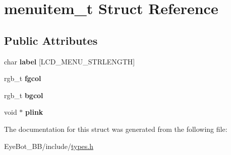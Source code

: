 \hypertarget{structmenuitem__t}{\section{menuitem\-\_\-t \-Struct \-Reference}
\label{structmenuitem__t}
}
\subsection*{\-Public \-Attributes}
\begin{DoxyCompactItemize}
\item 
\hypertarget{structmenuitem__t_a32e81d5a62c042327b8b9adc7f14bd5f}{char {\bfseries label} \mbox{[}\-L\-C\-D\-\_\-\-M\-E\-N\-U\-\_\-\-S\-T\-R\-L\-E\-N\-G\-T\-H\mbox{]}}\label{structmenuitem__t_a32e81d5a62c042327b8b9adc7f14bd5f}

\item 
\hypertarget{structmenuitem__t_a8c676dda5d8b53e59a704e4a43f2b611}{rgb\-\_\-t {\bfseries fgcol}}\label{structmenuitem__t_a8c676dda5d8b53e59a704e4a43f2b611}

\item 
\hypertarget{structmenuitem__t_ab00e66b47e9ce4eac4aa56c7d6289dac}{rgb\-\_\-t {\bfseries bgcol}}\label{structmenuitem__t_ab00e66b47e9ce4eac4aa56c7d6289dac}

\item 
\hypertarget{structmenuitem__t_a9942d3c583a258871e54e39def65ff53}{void $\ast$ {\bfseries plink}}\label{structmenuitem__t_a9942d3c583a258871e54e39def65ff53}

\end{DoxyCompactItemize}


\-The documentation for this struct was generated from the following file\-:\begin{DoxyCompactItemize}
\item 
\-Eye\-Bot\-\_\-\-B\-B/include/\hyperlink{types_8h}{types.\-h}\end{DoxyCompactItemize}
